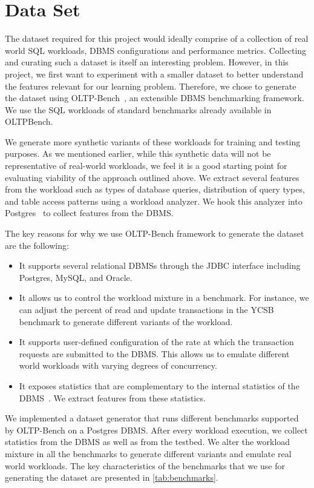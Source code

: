 \section{Data Set} \label{sec:data_set}

The dataset required for this project would ideally comprise of a
collection of real world SQL workloads, DBMS configurations and performance
metrics. Collecting and curating such a dataset is itself an interesting
problem.
However, in this project, we first want to experiment with a smaller dataset
to better understand the features relevant for our learning problem.
Therefore, we chose to generate the dataset using
OLTP-Bench~\citep{oltpbench14}, an extensible DBMS benchmarking framework.
We use the SQL workloads of standard benchmarks already available
in OLTPBench.

We generate more synthetic variants of these workloads for training and
testing purposes. As we mentioned earlier, while this synthetic data will not be
representative of real-world workloads, we feel it is a good starting point for
evaluating viability of the approach outlined above.
We extract several features from the workload such as types of database queries,
distribution of query types, and table access patterns using
a workload analyzer. We hook this analyzer into Postgres~\citep{postgres91} to collect
features from the DBMS.

The key reasons for why we use OLTP-Bench framework to generate the dataset
are the following:

\begin{itemize}
  \item It supports several relational DBMSs through the JDBC interface
  including Postgres, MySQL, and Oracle.
  \item It allows us to control the workload mixture in a benchmark. For
  instance, we can adjust the percent of read and update transactions in
  the YCSB~\citep{ycsb} benchmark to generate different variants of the workload.
  \item It supports user-defined configuration of the rate at which the
  transaction requests are submitted to the DBMS. This allows us to emulate
  different world workloads with varying degrees of concurrency.
  \item It exposes statistics that are complementary to the
  internal statistics of the DBMS~\citep{postgres14}. We extract features from
  these statistics.
\end{itemize}

We implemented a dataset generator that runs different benchmarks supported
by OLTP-Bench on a Postgres DBMS. After every workload execution, we
collect statistics from the DBMS as well as from the testbed. We alter the
workload mixture in all the benchmarks to generate different variants and
emulate real world workloads. The key characteristics of the benchmarks
that we use for generating the dataset are presented in \cref{tab:benchmarks}.

